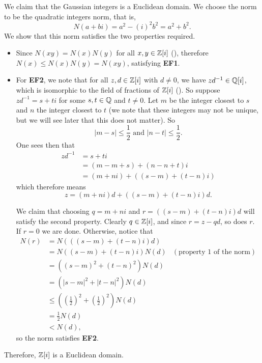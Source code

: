 \begin{example}\label{example-gaussian-integers-is-euclidean-domain}
    We claim that the Gaussian integers is a Euclidean domain. We choose the norm to be the quadratic integers norm, that is,
    \[
        N(a+bi) = a^2 - (i)^2b^2 = a^2+b^2.
    \]
    We show that this norm satisfies the two properties required.
    \begin{itemize}
        \item Since $N(xy) = N(x)N(y)$ for all $x,y \in \mathbb{Z}[i]$ (), therefore $N(x) \leq N(x)N(y) = N(xy)$, satisfying \textbf{EF1}.
        
        \item For \textbf{EF2}, we note that for all $z, d \in \mathbb{Z}[i]$ with $d \neq 0$, we have $zd^{-1} \in \mathbb{Q}[i]$, which is isomorphic to the field of fractions of $\mathbb{Z}[i]$ (). So suppose $zd^{-1} = s + ti$ for some $s,t \in \mathbb{Q}$ and $t \neq 0$. Let $m$ be the integer closest to $s$ and $n$ the integer closest to $t$ (we note that these integers may not be unique, but we will see later that this does not matter). So
        \[
            |m - s| \leq \frac12 \text{ and } |n - t| \leq \frac12.
        \]
        One sees then that
        \begin{align*}
            zd^{-1} &= s + ti\\
            &= (m - m + s) + (n - n + t)i\\
            &= (m+ni) + \left((s-m) + (t-n)i\right)
        \end{align*}
        which therefore means
        \[
            z = (m+ni)d + \left((s-m) + (t-n)i\right)d.
        \]

        We claim that choosing $q = m + ni$ and $r = \left((s-m) + (t-n)i\right)d$ will satisfy the second property. Clearly $q \in \mathbb{Z}[i]$, and since $r = z - qd$, so does $r$. If $r = 0$ we are done. Otherwise, notice that
        \begin{align*}
            N(r) &= N\left(\left((s-m) + (t-n)i\right)d\right)\\
            &= N((s-m) + (t-n)i)N(d) & (\text{property 1 of the norm})\\
            &= \left((s-m)^2 + (t-n)^2\right) N(d)\\
            &= \left(|s-m|^2 + |t-n|^2\right) N(d)\\
            &\leq \left(\left(\frac12\right)^2 + \left(\frac12\right)^2\right)N(d)\\
            &= \frac12 N(d)\\
            &< N(d),
        \end{align*}
        so the norm satisfies \textbf{EF2}.
    \end{itemize}
    Therefore, $\mathbb{Z}[i]$ is a Euclidean domain.
\end{example}

